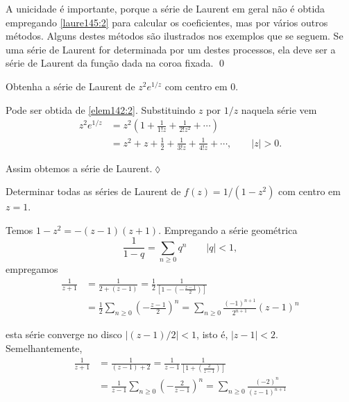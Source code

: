 A unicidade \'{e} importante, porque a s\'{e}rie de Laurent em geral n\~{a}o \'{e}
obtida empregando \eqref{laure145:2} para calcular os
coeficientes, mas por v\'{a}rios outros m\'{e}todos. Alguns destes m\'{e}todos
s\~{a}o ilustrados nos exemplos que se seguem. Se uma s\'{e}rie de Laurent
for determinada por um destes processos, ela deve ser a s\'{e}rie de
Laurent da fun\c{c}\~{a}o dada na coroa fixada. \qed

\begin{exer}\label{xe145:1}
Obtenha a s\'{e}rie de Laurent de $z^2e^{1/z}$ com centro em $0$.
\end{exer}

 \solo Pode ser obtida de \eqref{elem142:2}. Substituindo $z$ por $1/z$ naquela
s\'{e}rie vem
\begin{align*}
  z^2e^{1/z} &=z^2\left( 1+\frac{1}{1!z}+\frac{1}{2!z^2}+\cdots \right) \\[2ex]
   &=z^2  + z + \frac{1}{2} + \frac{1}{3!z}+\frac{1}{4!z}+\cdots,  \qquad|z| >0.
\end{align*}

Assim obtemos a s\'{e}rie de Laurent.\hfill \(\lozenge\)

\begin{exer}\label{xe145:2}
Determinar todas as s\'{e}ries de Laurent de $f(z) =
1/(1-z^2)$ com centro em $z = 1$.
\end{exer}

\solo  Temos $1 - z^2= -(z - 1) (z + 1)$. Empregando a s\'{e}rie
geom\'{e}trica
\begin{equation*}
 \frac{1}{1-q} =\sum_{n\geq 0}q^n\qquad |q|<1,
\end{equation*}
empregamos
\begin{align}
  \frac{1}{z+1} &= \frac{1}{2+(z-1)}=\frac{1}{2}\frac{1}{\left[1-\left(-\frac{z-1}{2}
  \right)\right]}\nonumber\\[2ex]
   &= \frac{1}{2}\sum_{n\geq 0}\left(-\frac{z-1}{2} \right)^n=\sum_{n\geq 0}
   \frac{(-1)^{n+1}}{2^{n+1}}(z-1)^n\label{laure145:a}
\end{align}

esta s\'{e}rie converge no disco $|(z - 1)/2| < 1$, isto \'{e}, $|z-1| <
2$. Semelhantemente,
\begin{align}
\frac{1}{z+1} &=
\frac{1}{(z-1)+2}=\frac{1}{z-1}\frac{1}{\left[1+\left(\frac{2}{z-1}\right)\right]}
\nonumber\\[2ex]
&= \frac{1}{z-1}\sum_{n\geq 0}\left(-\frac{2}{z-1} \right)^n=\sum_{n\geq 0}
   \frac{(-2)^{n}}{(z-1)^{n+1}}\label{laure145:b}
\end{align}

